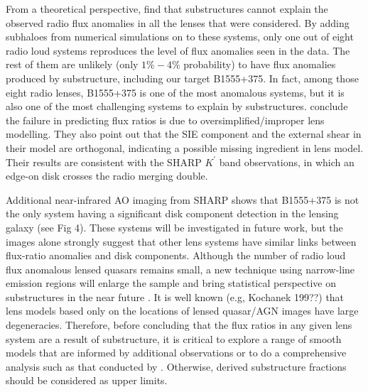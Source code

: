 \documentclass[useAMS,usenatbib]{mn2e}
\begin{document}
From a theoretical perspective, \citet{Xu14} find that substructures
cannot explain the observed radio flux anomalies in all the lenses
that were considered. By adding subhaloes from numerical simulations
on to these systems, only one out of eight radio loud systems
reproduces the level of flux anomalies seen in the data.  The rest of
them are unlikely (only $1 \% - 4 \%$ probability) to have flux
anomalies produced by substructure, including our target B1555+375.
In fact, among those eight radio lenses, B1555+375 is one of the most
anomalous systems, but it is also one of the most challenging systems
to explain by substructures. \citet{Xu14} conclude the failure in
predicting flux ratios is due to oversimplified/improper lens
modelling. They also point out that the SIE component and the external
shear in their model are orthogonal, indicating a possible missing
ingredient in lens model. Their results are consistent with the SHARP
$K^{\prime}$ band observations, in which an edge-on disk crosses the
radio merging double. 

Additional near-infrared AO imaging from SHARP shows that B1555+375 is
not the only system having a significant disk component detection in
the lensing galaxy (see Fig 4).  These systems will be investigated in
future work, but the images alone strongly suggest that other lens
systems have similar links between flux-ratio anomalies and disk
components.  Although the number of radio loud flux anomalous lensed
quasars remains small, a new technique using narrow-line emission
regions will enlarge the sample and bring statistical perspective on
substructures in the near future \citep{N14}. It is well known (e.g,
Kochanek 199??) that lens models based only on the locations of lensed
quasar/AGN images have large degeneracies.  Therefore, before
concluding that the flux ratios in any given lens system are a result
of substructure, it is critical to explore a range of smooth models
that are informed by additional observations or to do a comprehensive
analysis such as that conducted by \citet{Xu14}.  Otherwise, derived
substructure fractions should be considered as upper limits.

\end{document}
